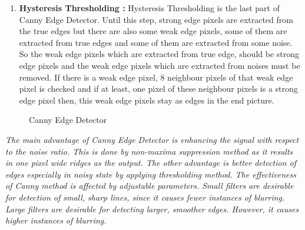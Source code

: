\begin{enumerate}
\item \textbf{Hysteresis Thresholding : } Hysteresis Thresholding is the last part of Canny Edge Detector. Until this step, strong edge pixels are extracted from the true edges but there are also some weak edge pixels, some of them are extracted from true edges and some of them are extracted from some noise. So the weak edge pixels which are extracted from true edge, should be strong edge pixels and the weak edge pixels which are extracted from noises must be removed. If there is a weak edge pixel, 8 neighbour pixels of that weak edge pixel is checked and if at least, one pixel of these neighbour pixels is a strong edge pixel then, this weak edge pixels stay as edges in the end picture. 

\end{enumerate}


\begin{figure}[H]
  \centering
  \hfill
  \caption{Canny Edge Detector\cite{Canny_Edge_Detector}}
\end{figure} 




\emph{\color{red} The main advantage of Canny Edge Detector is enhancing the signal with respect to the noise ratio. This is done by non-maxima suppression method as it results in one pixel wide ridges as the output. The other advantage is better detection of edges especially in noisy state by applying thresholding method. The effectiveness of Canny method is affected by adjustable parameters. Small filters are desirable for detection of small, sharp lines, since it causes fewer instances of blurring. Large filters are desirable for detecting larger, smoother edges. However, it causes higher instances of blurring. }

